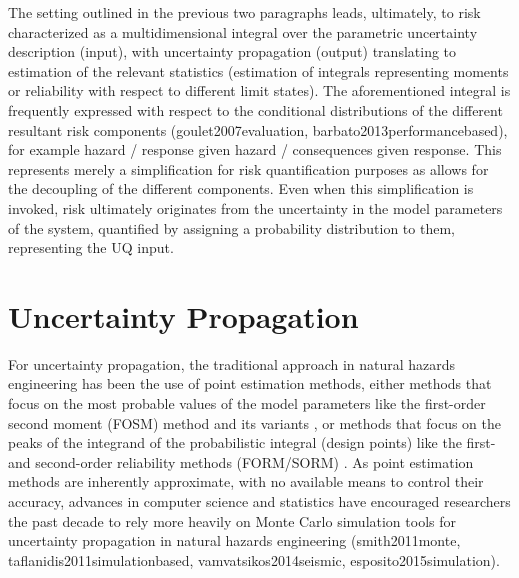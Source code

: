 The setting outlined in the previous two paragraphs leads, ultimately, to risk characterized as a multidimensional integral over the parametric uncertainty description (input), with uncertainty propagation (output) translating to estimation of the relevant statistics (estimation of integrals representing moments or reliability with respect to different limit states). The aforementioned integral is frequently expressed with respect to the conditional distributions of the different resultant risk components (goulet2007evaluation, barbato2013performancebased), for example {hazard / response given hazard / consequences given response}. This represents merely a simplification for risk quantification purposes as allows for the decoupling of the different components. Even when this simplification is invoked, risk ultimately originates from the uncertainty in the model parameters of the system, quantified by assigning a probability distribution to them, representing the UQ input. 

\section{Uncertainty Propagation}
\label{sec:uq_propagation}

For uncertainty propagation, the traditional approach in natural hazards engineering has been the use of point estimation methods, either methods that focus on the most probable values of the model parameters like the first-order second moment (FOSM) method \citep{baker2008uncertainty} and its variants \citep{vamvatsikos2013derivation}, or methods that focus on the peaks of the integrand of the probabilistic integral (design points) like the first- and second-order reliability methods (FORM/SORM) \citep{koduru2010feasibility}. As point estimation methods are inherently approximate, with no available means to control their accuracy, advances in computer science and statistics have encouraged researchers the past decade to rely more heavily on Monte Carlo simulation tools for uncertainty propagation in natural hazards engineering (smith2011monte, taflanidis2011simulationbased, vamvatsikos2014seismic, esposito2015simulation). 

